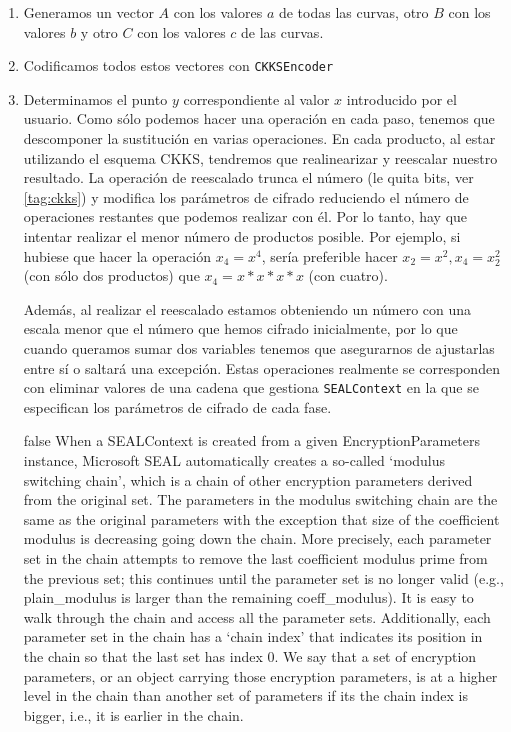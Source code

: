 \begin{enumerate}
    \item Generamos un vector $A$ con los valores $a$ de todas las curvas, otro $B$ con los valores $b$ y otro $C$ con los valores $c$ de las curvas.
    \item Codificamos todos estos vectores con \verb|CKKSEncoder|

    \item Determinamos el punto $y$ correspondiente al valor $x$ introducido por el usuario.
    Como sólo podemos hacer una operación en cada paso, tenemos que descomponer la sustitución en varias operaciones. En cada producto, al estar utilizando el esquema CKKS, tendremos que realinearizar y reescalar nuestro resultado. La operación de reescalado trunca el número (le quita bits, ver \ref{tag:ckks}) y modifica los parámetros de cifrado reduciendo el número de operaciones restantes que podemos realizar con él. Por lo tanto, hay que intentar realizar el menor número de productos posible. Por ejemplo, si hubiese que hacer la operación $x_4=x^4$, sería preferible hacer $x_2 = x^2, x_4 = x_2^2$ (con sólo dos productos) que $x_4 = x * x * x * x$ (con cuatro).

    Además, al realizar el reescalado estamos obteniendo un número con una escala menor que el número que hemos cifrado inicialmente, por lo que cuando queramos sumar dos variables tenemos que asegurarnos de ajustarlas entre sí o saltará una excepción. Estas operaciones realmente se corresponden con eliminar valores de una cadena que gestiona \verb|SEALContext| en la que se especifican los parámetros de cifrado de cada fase.

    \if false
      When a SEALContext is created from a given EncryptionParameters instance,
      Microsoft SEAL automatically creates a so-called `modulus switching chain',
      which is a chain of other encryption parameters derived from the original set.
      The parameters in the modulus switching chain are the same as the original
      parameters with the exception that size of the coefficient modulus is
      decreasing going down the chain. More precisely, each parameter set in the
      chain attempts to remove the last coefficient modulus prime from the
      previous set; this continues until the parameter set is no longer valid
      (e.g., plain_modulus is larger than the remaining coeff_modulus). It is easy
      to walk through the chain and access all the parameter sets. Additionally,
      each parameter set in the chain has a `chain index' that indicates its
      position in the chain so that the last set has index 0. We say that a set
      of encryption parameters, or an object carrying those encryption parameters,
      is at a higher level in the chain than another set of parameters if its the
      chain index is bigger, i.e., it is earlier in the chain.


\end{enumerate}
